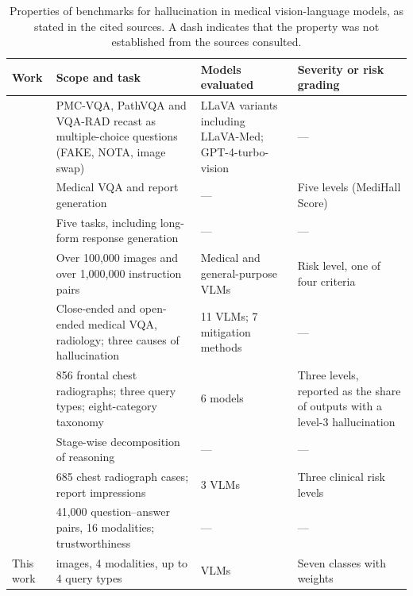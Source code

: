 \begin{table}[t]
\centering
\small
\caption{Properties of benchmarks for hallucination in medical vision-language models, as stated in the cited sources. A dash indicates that the property was not established from the sources consulted.}
\label{tab:related}
\begin{tabular}{@{}p{2.3cm}p{4.9cm}p{3.5cm}p{3.1cm}@{}}
\toprule
Work & Scope and task & Models evaluated & Severity or risk grading \\
\midrule
\citet{wu2024halluvqa} & PMC-VQA, PathVQA and VQA-RAD recast as multiple-choice questions (FAKE, NOTA, image swap) & LLaVA variants including LLaVA-Med; GPT-4-turbo-vision & --- \\
\citet{chen2024medhallmark} & Medical VQA and report generation & --- & Five levels (MediHall Score) \\
\citet{gu2024medvh} & Five tasks, including long-form response generation & --- & --- \\
\citet{yan2025medhalltune} & Over 100,000 images and over 1,000,000 instruction pairs & Medical and general-purpose VLMs & Risk level, one of four criteria \\
\citet{chang2025medheval} & Close-ended and open-ended medical VQA, radiology; three causes of hallucination & 11 VLMs; 7 mitigation methods & --- \\
\citet{wang2026hallucxr} & 856 frontal chest radiographs; three query types; eight-category taxonomy & 6 models & Three levels, reported as the share of outputs with a level-3 hallucination \\
\citet{yang2026clinhallu} & Stage-wise decomposition of reasoning & --- & --- \\
\citet{crest2025medrxiv} & 685 chest radiograph cases; report impressions & 3 VLMs & Three clinical risk levels \\
\citet{xia2024cares} & 41,000 question--answer pairs, 16 modalities; trustworthiness & --- & --- \\
This work & \Nimages{} images, 4 modalities, up to 4 query types & \Nmodels{} VLMs & Seven classes with weights \\
\bottomrule
\end{tabular}
\end{table}

